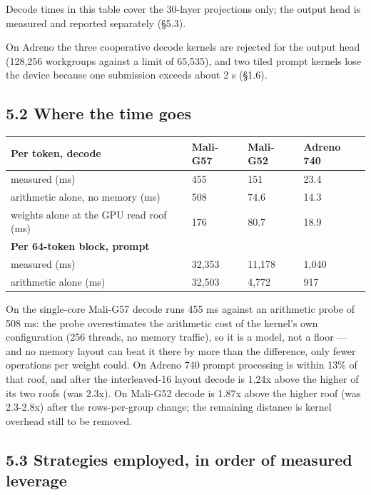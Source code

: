 \documentclass[
  10pt,
]{article}
\newcounter{none} %
\begin{document}
Decode times in this table cover the 30-layer projections only; the output
head is measured and reported separately (\S{}5.3).

On Adreno the three cooperative decode kernels are rejected for the
output head (128,256 workgroups against a limit of 65,535), and two
tiled prompt kernels lose the device because one submission exceeds
about 2 s (\S{}1.6).

\subsection{5.2 Where the time goes}\label{where-the-time-goes}

{\def\LTcaptype{none} %
\begin{longtable}[]{@{}llll@{}}
\toprule\noalign{}
Per token, decode & Mali-G57 & Mali-G52 & Adreno 740 \\
\midrule\noalign{}
\endhead%
\bottomrule\noalign{}
\endlastfoot%
measured (ms) & 455 & 151 & 23.4 \\
arithmetic alone, no memory (ms) & 508 & 74.6 & 14.3 \\
weights alone at the GPU read roof (ms) & 176 & 80.7 & 18.9 \\
\textbf{Per 64-token block, prompt} & & & \\
measured (ms) & 32,353 & 11,178 & 1,040 \\
arithmetic alone (ms) & 32,503 & 4,772 & 917 \\
\end{longtable}
}

On the single-core Mali-G57 decode runs 455 ms against an arithmetic
probe of 508 ms: the probe overestimates the arithmetic cost of the
kernel's own configuration (256 threads, no memory traffic), so it is a
model, not a floor --- and no memory layout can beat it there by more
than the difference, only fewer operations per weight could. On Adreno
740 prompt processing is within 13\% of that roof, and after the
interleaved-16 layout decode is 1.24x above the higher of its two roofs
(was 2.3x). On Mali-G52 decode is 1.87x above the higher roof (was
2.3-2.8x) after the rows-per-group change; the remaining distance is
kernel overhead still to be removed.

\subsection{5.3 Strategies employed, in order of measured
leverage}\label{strategies-employed-in-order-of-measured-leverage}
\end{document}
